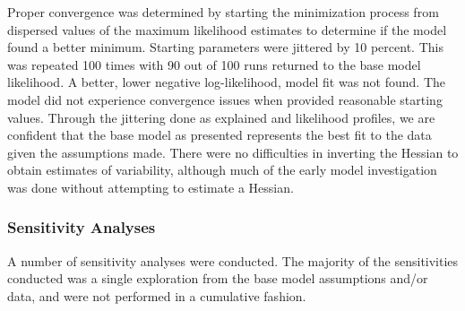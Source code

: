 \documentclass[11pt,
  english,
  a4paper,
]{article}
\begin{document}
Proper convergence was determined by starting the minimization process from dispersed values of the maximum likelihood estimates to determine if the model found a better minimum. Starting parameters were jittered by 10 percent. This was repeated 100 times with 90 out of 100 runs returned to the base model likelihood. A better, lower negative log-likelihood, model fit was not found. The model did not experience convergence issues when provided reasonable starting values. Through the jittering done as explained and likelihood profiles, we are confident that the base model as presented represents the best fit to the data given the assumptions made. There were no difficulties in inverting the Hessian to obtain estimates of variability, although much of the early model investigation was done without attempting to estimate a Hessian.

\leavevmode\tagmcend\tagstructend\par


\hypertarget{sensitivities}{%
\subsubsection{Sensitivity Analyses}\label{sensitivities}}

\leavevmode\tagmcend\tagstructend


A number of sensitivity analyses were conducted. The majority of the sensitivities conducted was a single exploration from the base model assumptions and/or data, and were not performed in a cumulative fashion.

\leavevmode\tagmcend\tagstructend\par
\end{document}
